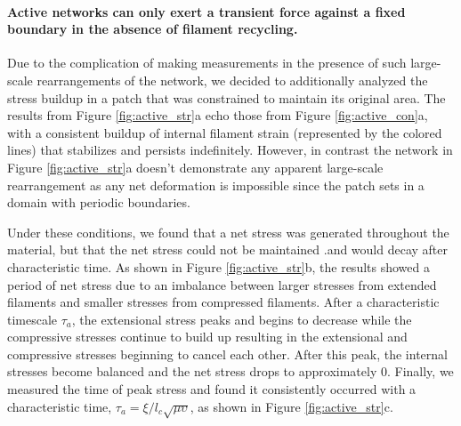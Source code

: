 \documentclass[10pt,letterpaper]{article}
\begin{document}
\paragraph{Active networks can only exert a transient force against a fixed boundary in the absence of filament recycling.}

Due to the complication of making measurements in the presence of such large-scale rearrangements of the network, we decided to additionally analyzed the stress buildup in a patch that was constrained to maintain its original area.  The results from Figure \ref{fig:active_str}a echo those from Figure \ref{fig:active_con}a, with a consistent buildup of internal filament strain (represented by the colored lines) that stabilizes and persists indefinitely.  However, in contrast the network in Figure \ref{fig:active_str}a doesn't demonstrate any apparent large-scale rearrangement as any net deformation is impossible since the patch sets in a domain with periodic boundaries.

Under these conditions, we found that a net stress was generated throughout the material, but that the net stress could not be maintained .and would decay after  characteristic time.  As shown in Figure \ref{fig:active_str}b, the results showed a period of net stress due to an imbalance between larger stresses from extended filaments and smaller stresses from compressed filaments.  After a characteristic timescale $\tau_a$, the extensional stress peaks and begins to decrease while the compressive stresses continue to build up resulting in the extensional and compressive stresses beginning to cancel each other.  After this peak, the internal stresses become balanced and the net stress drops to approximately 0.  Finally, we measured the time of peak stress and found it consistently occurred with a characteristic time, $\tau_a=\xi/l_c\sqrt{\mu\upsilon}$, as shown in Figure \ref{fig:active_str}c. 
\end{document}
